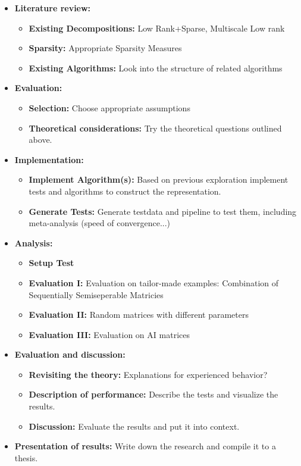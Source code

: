 \documentclass[lang=ngerman,inputenc=utf8,fontsize=10pt]{ldvarticle}
\begin{document}
\begin{itemize}
	\item \textbf{Literature review:}
	\begin{itemize}
			\item \textbf{Existing Decompositions:} Low Rank+Sparse, Multiscale Low rank \cite{chandrasekaran_sparse_2009,ong_beyond_2016,yu_compressing_2017}
			\item \textbf{Sparsity:} Appropriate Sparsity Measures \cite{ulfarsson_sparse_2015,parekh_improved_2017}
			\item \textbf{Existing Algorithms:} Look into the structure of related algorithms
		\end{itemize}
	\item \textbf{Evaluation:} 
		\begin{itemize}
			\item \textbf{Selection:} Choose appropriate assumptions
			\item \textbf{Theoretical considerations:} Try the theoretical questions outlined above.
		\end{itemize}
	\item \textbf{Implementation:} 
		\begin{itemize}
			\item \textbf{Implement Algorithm(s):} Based on previous exploration implement tests and algorithms to construct the representation.
			\item \textbf{Generate Tests:} Generate testdata and pipeline to test them, including meta-analysis (speed of convergence...)
		\end{itemize}
	\item \textbf{Analysis:} 
		\begin{itemize}
			\item \textbf{Setup Test}
			\item \textbf{Evaluation I:} Evaluation on tailor-made examples: Combination of Sequentially Semiseperable Matricies %
			\item \textbf{Evaluation II:} Random matrices with different parameters
			\item \textbf{Evaluation III:} Evaluation on AI matrices
		\end{itemize}
	\item \textbf{Evaluation and discussion:} 
		\begin{itemize}
			\item \textbf{Revisiting the theory:} Explanations for experienced behavior?
			\item \textbf{Description of performance:} Describe the tests and visualize the results.
			\item \textbf{Discussion:} Evaluate the results and put it into context.
		\end{itemize}
	\item \textbf{Presentation of results:} Write down the research and compile it to a thesis. 
\end{itemize}
\end{document}
